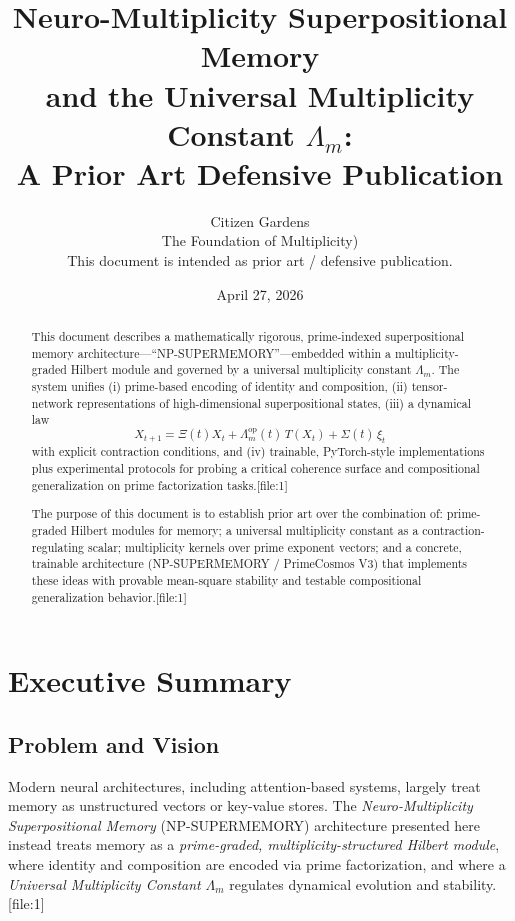 \documentclass[11pt]{article}
\title{%
Neuro-Multiplicity Superpositional Memory \\
and the Universal Multiplicity Constant \texorpdfstring{$\Lambda_m$}{Λ\_m}: \\
A Prior Art Defensive Publication
}
\author{Citizen Gardens \\ The Foundation of Multiplicity)\\[4pt]
\small This document is intended as prior art / defensive publication.}
\date{April 27, 2026}
\begin{document}
\maketitle

\begin{abstract}
This document describes a mathematically rigorous, prime-indexed superpositional memory architecture---``NP-SUPERMEMORY''---embedded within a multiplicity-graded Hilbert module and governed by a universal multiplicity constant $\Lambda_m$. The system unifies (i) prime-based encoding of identity and composition, (ii) tensor-network representations of high-dimensional superpositional states, (iii) a dynamical law
\[
X_{t+1} = \Xi(t) X_t + \Lambda_m^{\mathrm{op}}(t)\,T(X_t) + \Sigma(t)\,\xi_t
\]
with explicit contraction conditions, and (iv) trainable, PyTorch-style implementations plus experimental protocols for probing a critical coherence surface and compositional generalization on prime factorization tasks.[file:1]

The purpose of this document is to establish prior art over the combination of: prime-graded Hilbert modules for memory; a universal multiplicity constant as a contraction-regulating scalar; multiplicity kernels over prime exponent vectors; and a concrete, trainable architecture (NP-SUPERMEMORY / PrimeCosmos V3) that implements these ideas with provable mean-square stability and testable compositional generalization behavior.[file:1]
\end{abstract}
\newpage
\tableofcontents
\newpage

\section{Executive Summary}

\subsection{Problem and Vision}

Modern neural architectures, including attention-based systems, largely treat memory as unstructured vectors or key-value stores. The \emph{Neuro-Multiplicity Superpositional Memory} (NP-SUPERMEMORY) architecture presented here instead treats memory as a \emph{prime-graded, multiplicity-structured Hilbert module}, where identity and composition are encoded via prime factorization, and where a \emph{Universal Multiplicity Constant} $\Lambda_m$ regulates dynamical evolution and stability.[file:1]
\end{document}
